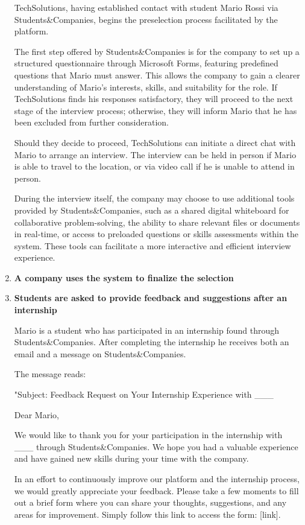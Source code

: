 \begin{enumerate}
    TechSolutions, having established contact with student Mario Rossi via Students\&Companies, begins the preselection process facilitated by the platform.

    The first step offered by Students\&Companies is for the company to set up a structured questionnaire through Microsoft Forms, featuring predefined questions that Mario must answer. This allows the company to gain a clearer understanding of Mario’s interests, skills, and suitability for the role. If TechSolutions finds his responses satisfactory, they will proceed to the next stage of the interview process; otherwise, they will inform Mario that he has been excluded from further consideration.

    Should they decide to proceed, TechSolutions can initiate a direct chat with Mario to arrange an interview. The interview can be held in person if Mario is able to travel to the location, or via video call if he is unable to attend in person.

    During the interview itself, the company may choose to use additional tools provided by Students\&Companies, such as a shared digital whiteboard for collaborative problem-solving, the ability to share relevant files or documents in real-time, or access to preloaded questions or skills assessments within the system. These tools can facilitate a more interactive and efficient interview experience.

    \item \textbf{A company uses the system to finalize the selection}

    \item \textbf{Students are asked to provide feedback and suggestions after an internship}

    Mario is a student who has participated in an internship found through Students\&Companies. After completing the internship he receives both an email and a message on Students\&Companies.

    The message reads:

    "Subject: Feedback Request on Your Internship Experience with \_\_\_

    Dear Mario,

    We would like to thank you for your participation in the internship with \_\_\_ through Students\&Companies. We hope you had a valuable experience and have gained new skills during your time with the company.

    In an effort to continuously improve our platform and the internship process, we would greatly appreciate your feedback. Please take a few moments to fill out a brief form where you can share your thoughts, suggestions, and any areas for improvement. Simply follow this link to access the form: [link].


\end{enumerate}
